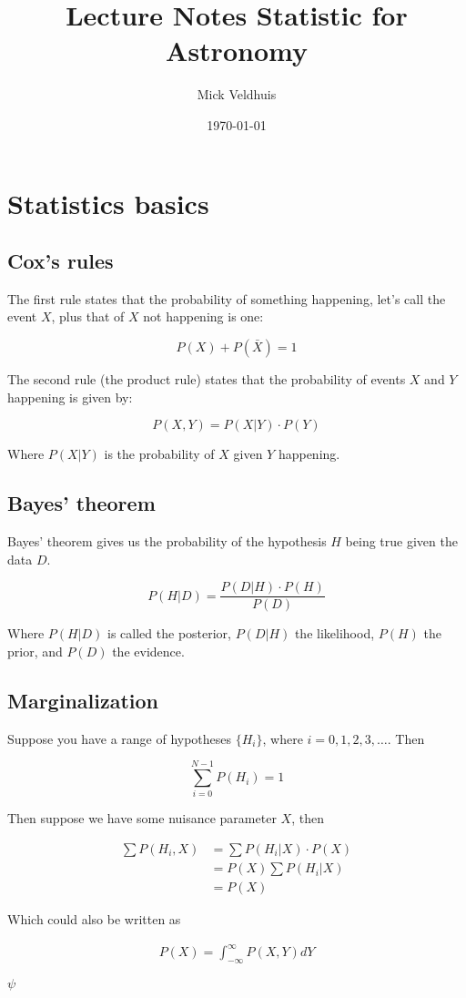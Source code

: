 \documentclass[a4paper]{article}
\title{Lecture Notes Statistic for Astronomy}
\author{Mick Veldhuis}
\date{\today}
\begin{document}
\maketitle

\tableofcontents

\section{Statistics basics}

\subsection{Cox's rules}

The first rule states that the probability of something happening, let's call the event $X$, plus that of $X$ not happening is one:

\begin{equation}
	P(X)+P(\bar{X})=1
\end{equation}

The second rule (the product rule) states that the probability of events $X$ and $Y$ happening is given by:

\begin{equation}
	P(X,Y)=P(X|Y)\cdot P(Y)
\end{equation}

Where $P(X|Y)$ is the probability of $X$ given $Y$ happening.

\subsection{Bayes' theorem}

Bayes' theorem gives us the probability of the hypothesis $H$ being true given the data $D$.

\begin{equation}
	P(H|D)=\frac{P(D|H)\cdot P(H)}{P(D)}
\end{equation}

Where $P(H|D)$ is called the posterior, $P(D|H)$ the likelihood, $P(H)$ the prior, and $P(D)$ the evidence. 

\subsection{Marginalization}

Suppose you have a range of hypotheses $\{H_i\}$, where $i=0,1,2,3,\dots$. Then

\begin{equation}
	\sum_{i=0}^{N-1} P(H_i)=1
\end{equation}

Then suppose we have some nuisance parameter $X$, then 

\begin{align}
	\sum P(H_i,X) &= \sum P(H_i|X)\cdot P(X)\\[1em]
	&= P(X)\sum P(H_i|X)\\[1em]
	&= P(X)
\end{align}

Which could also be written as

\begin{align}
	P(X)=\int_{-\infty}^{\infty} P(X,Y)dY
\end{align}

$\psi$
\end{document}
